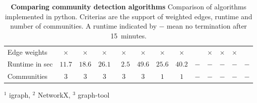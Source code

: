 

\newcommand{\mc}[2]{\multicolumn{#1}{c}{#2}}

\begin{table}[htbp]
\caption[Compairing community detection algorithms]{\textbf{Comparing community detection algorithms} Comparison of algorithms implemented in python. Criterias are the support of weighted edges, runtime and number of communities. A runtime indicated by $-$ mean no termination after 15~minutes.\\
}
\label{tab:algos}

\begin{tabular}{laacaaccccccc}
\toprule
	 {} &
	  &
	  &
	  &
	  &
	  &
	 
	  &
	  &
	 
	  &
	  &
	  &
	  &
	  \\ \midrule
	 
	 
	 
	 Edge weights & $\times$ & $\times$ & $\times$ & $\times$ & $\times$ & $\times$ & $\times$ & & $\times$ & $\times$ & $\times$ \\ \midrule
	 Runtime in sec & $11.7$ & $18.6$ & $26.1$ & ~$2.5$ & $49.6$ & $25.6$ & $40.2$ & $-$ & $-$ & $-$ & $-$ & $-$ \\ \midrule
	 Communities & $3$ & $3$ & $3$ & $3$ & $3$ & $1$ & $1$ & $-$ & $-$ & $-$ & $-$ & $-$ \\ \bottomrule
	 
\end{tabular}
\begin{flushright}
\footnotesize{
$^1$ igraph, $^2$ NetworkX, $^3$ graph-tool\\
}
\end{flushright}

\end{table}

